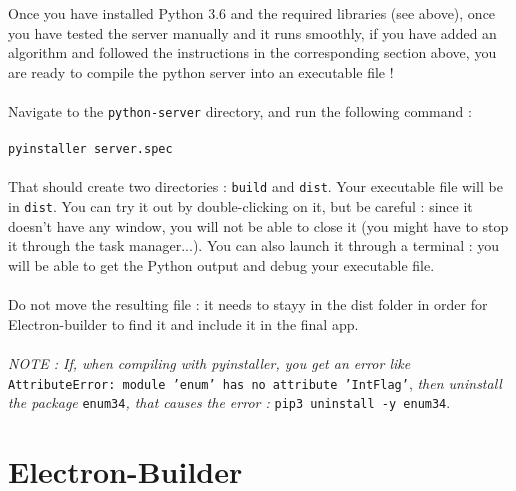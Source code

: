 \documentclass[12pt,a4paper]{article}
\begin{document}
Once you have installed Python 3.6 and the required libraries (see above), once you have tested the server manually and it runs smoothly, if you have added an algorithm and followed the instructions in the corresponding section above, you are ready to compile the python server into an executable file !\\
~\\
Navigate to the \texttt{python-server} directory, and run the following command :\\
~\\
\texttt{pyinstaller server.spec}\\
~\\
That should create two directories : \texttt{build} and \texttt{dist}. Your executable file will be in \texttt{dist}. You can try it out by double-clicking on it, but be careful : since it doesn't have any window, you will not be able to close it (you might have to stop it through the task manager...). You can also launch it through a terminal : you will be able to get the Python output and debug your executable file.\\
~\\
Do not move the resulting file : it needs to stayy in the dist folder in order for Electron-builder to find it and include it in the final app.\\
~\\
\textit{NOTE : If, when compiling with pyinstaller, you get an error like} \texttt{AttributeError: module 'enum' has no attribute 'IntFlag'}, \textit{then uninstall the package} \texttt{enum34}\textit{, that causes the error :} \texttt{pip3 uninstall -y enum34}.

\section{Electron-Builder}
\end{document}

